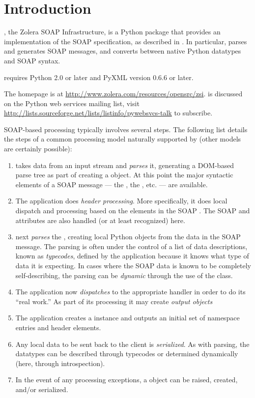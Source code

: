 \chapter{Introduction}

\ZSI{}, the Zolera SOAP Infrastructure, is a Python package that
provides an implementation of the SOAP specification, as described in
.
In particular, \ZSI{} parses and generates SOAP messages, and
converts between native Python datatypes and SOAP syntax.

 requires Python 2.0 or later and PyXML version 0.6.6 or later.

The  homepage is at
\url{http://www.zolera.com/resources/opensrc/zsi}.
\ZSI{} is discussed on the Python web services mailing list, visit
\url{http://lists.sourceforge.net/lists/listinfo/pywebsvcs-talk}
to subscribe.

SOAP-based processing typically involves several steps.
The following list details the steps of a common processing model naturally
supported by \ZSI{} (other models are certainly possible):
\begin{enumerate}
\item
    \ZSI{} takes data from an input stream and \emph{parses} it, generating
    a DOM-based parse tree as part of creating a  object.
    At this point the major syntactic elements of a SOAP message --- the
    , the , etc. --- are available.
\item
    The application does \emph{header processing}.
    More specifically, it does local dispatch and processing based on
    the elements in the SOAP .
    The SOAP  and  attributes are
    also handled (or at least recognized) here.
\item
    \ZSI{} next \emph{parses} the , creating local Python objects
    from the data in the SOAP message.
    The parsing is often under the control of a list of data descriptions,
    known as \emph{typecodes}, defined by the application because it knows
    what type of data it is expecting.
    In cases where the SOAP data is known to be completely self-describing,
    the parsing can be \emph{dynamic} through the use of the 
    class.
\item
    The application now \emph{dispatches} to the appropriate handler
    in order to do its ``real work.''
    As part of its processing it may create \emph{output objects}
\item
    The application creates a  instance and outputs
    an initial set of namespace entries and header elements.
\item
    Any local data to be sent back to the client is \emph{serialized}.
    As with  parsing, the datatypes can be described through
    typecodes or determined dynamically (here, through introspection).
\item
    In the event of any processing exceptions, a  object
    can be raised, created, and/or serialized.
\end{enumerate}

